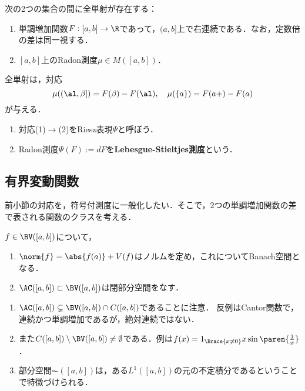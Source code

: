 \documentclass[uplatex, dvipdfmx]{jsreport}
\begin{document}
\begin{theorem}[$\R$上のRadon積分に関するRiesz対応]
    次の2つの集合の間に全単射が存在する：
    \begin{enumerate}
        \item 単調増加関数$F:[a,b]\to\R$であって，$(a,b]$上で右連続である．なお，定数倍の差は同一視する．
        \item $[a,b]$上のRadon測度$\mu\in M([a,b])$．
    \end{enumerate}
    全単射は，対応
    \[\mu((\al,\beta])=F(\beta)-F(\al),\quad\mu(\{a\})=F(a+)-F(a)\]
    が与える．
\end{theorem}
\begin{definition}\mbox{}
    \begin{enumerate}
        \item 対応(1)$\to$(2)をRiesz表現$\Psi$と呼ぼう．
        \item Radon測度$\Psi(F):=dF$を\textbf{Lebesgue-Stieltjes測度}という．
    \end{enumerate}
\end{definition}

\subsection{有界変動関数}

\begin{tcolorbox}[colframe=ForestGreen, colback=ForestGreen!10!white,breakable,colbacktitle=ForestGreen!40!white,coltitle=black,fonttitle=\bfseries\sffamily,
title=]
    前小節の対応を，符号付測度に一般化したい．そこで，2つの単調増加関数の差で表される関数のクラスを考える．
\end{tcolorbox}

\begin{theorem}[有界変動関数のなすBanach空間]
    $f\in\BV([a,b])$について，
    \begin{enumerate}
        \item $\norm{f}=\abs{f(a)}+V(f)$はノルムを定め，これについてBanach空間となる．
        \item $\AC([a,b])\subset\BV([a,b])$は閉部分空間をなす．
    \end{enumerate}
\end{theorem}

\begin{remark}\mbox{}
    \begin{enumerate}
        \item $\AC([a,b])\subsetneq\BV([a,b])\cap C([a,b])$であることに注意．
        反例はCantor関数で，連続かつ単調増加であるが，絶対連続ではない．
        \item また$C([a,b])\setminus\BV([a,b])\ne\emptyset$である．例は$f(x)=1_{\Brace{x\ne0}}x\sin\paren{\frac{1}{x}}$．
        \item 部分空間$\AC([a,b])$は，ある$L^1([a,b])$の元の不定積分であるということで特徴づけられる．
    \end{enumerate}
\end{remark}
\end{document}
